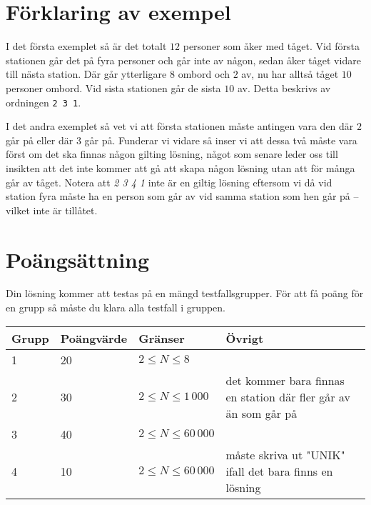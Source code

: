 \section*{Förklaring av exempel}
I det första exemplet så är det totalt $12$ personer som åker med tåget. Vid första stationen
går det på fyra personer och går inte av någon, sedan åker tåget vidare till
nästa station. Där går ytterligare $8$ ombord och $2$ av, nu har alltså tåget $10$
personer ombord. Vid sista stationen går de sista $10$ av. Detta beskrivs av ordningen
\texttt{2 3 1}.

I det andra exemplet så vet vi att första stationen måste antingen vara den där $2$ går på eller där $3$
går på. Funderar vi vidare så inser vi att dessa två måste vara först om det ska finnas någon gilting lösning,
något som senare leder oss till insikten att det inte kommer att gå att skapa någon lösning utan att för många
går av tåget. Notera att \emph{2 3 4 1} inte är en giltig lösning eftersom vi då vid station fyra måste ha en person
som går av vid samma station som hen går på -- vilket inte är tillåtet.

\section*{Poängsättning}
Din lösning kommer att testas på en mängd testfallsgrupper. För att få poäng för en grupp så måste du klara alla testfall i gruppen.

\begin{tabular}{| l | l | l | l |}
\hline
Grupp & Poängvärde & Gränser & Övrigt\\ \hline
1     & 20         & $ 2 \le N \le 8 $ & \\ \hline
2     & 30         & $ 2 \le N \le 1\,000 $ & det kommer bara finnas en station där fler går av än som går på \\ \hline
3     & 40         & $ 2 \le N \le 60\,000 $ & \\ \hline
4     & 10         & $ 2 \le N \le 60\,000 $ & måste skriva ut "UNIK" ifall det bara finns en lösning \\ \hline
\end{tabular}
